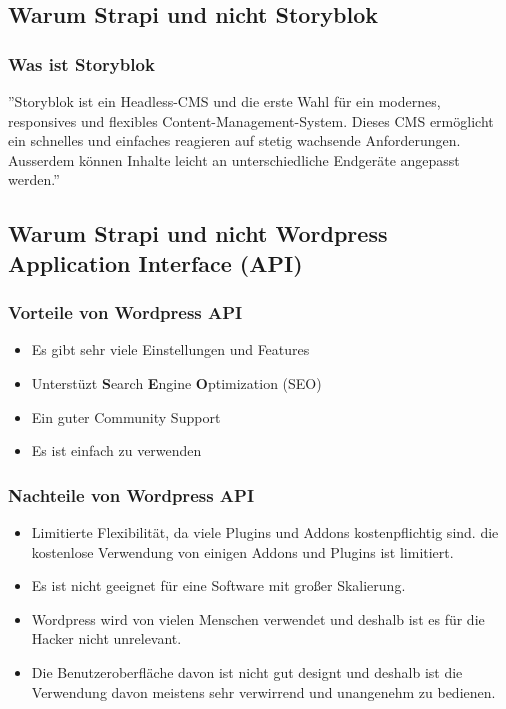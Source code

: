 \begin{spacing}{1}
    \subsection{Warum Strapi und nicht Storyblok}
    \subsubsection{Was ist Storyblok}
    ''Storyblok ist ein Headless-CMS und die erste Wahl für ein modernes,
    responsives und flexibles Content-Management-System.
    Dieses CMS ermöglicht ein schnelles und einfaches reagieren auf stetig wachsende Anforderungen.
    Ausserdem können Inhalte leicht an unterschiedliche Endgeräte angepasst werden.''
    \cite{storyblok}
    \subsection{Warum Strapi und nicht Wordpress \textbf{Ap}plication \textbf{I}nterface (API)}



    \subsubsection{Vorteile von Wordpress API}

    \begin{itemize}
        \item Es gibt sehr viele Einstellungen und Features
        \item Unterstüzt \textbf{S}earch \textbf{E}ngine \textbf{O}ptimization (SEO)
        \item Ein guter Community Support
        \item Es ist einfach zu verwenden
    \end{itemize}
    \cite{strapi-vs-wordpress}

    \subsubsection{Nachteile von Wordpress API}
    \begin{itemize}
        \item  Limitierte Flexibilität, da viele Plugins und Addons kostenpflichtig sind.
              die kostenlose Verwendung von einigen Addons und Plugins ist limitiert.
        \item Es ist nicht geeignet für eine Software mit großer Skalierung.
        \item Wordpress wird von vielen Menschen verwendet und deshalb ist es für die Hacker nicht unrelevant.
        \item Die Benutzeroberfläche davon ist nicht gut designt und deshalb ist die Verwendung davon meistens sehr verwirrend und unangenehm zu bedienen.
    \end{itemize}
    \cite{strapi-vs-wordpress}


\end{spacing}
